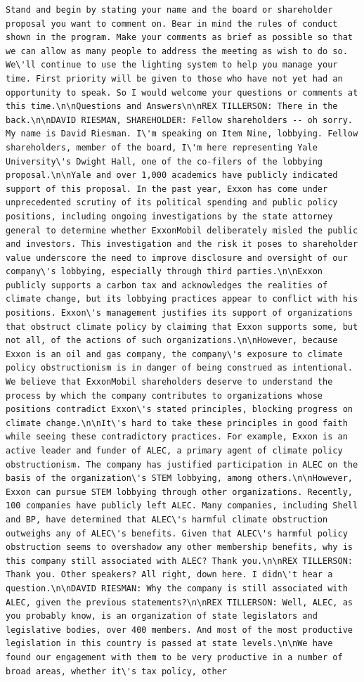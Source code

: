 \documentclass[
  letterpaper,
  DIV=11,
  numbers=noendperiod]{scrreprt}
\begin{document}
\begin{verbatim}
Stand and begin by stating your name and the board or shareholder proposal you want to comment on. Bear in mind the rules of conduct shown in the program. Make your comments as brief as possible so that we can allow as many people to address the meeting as wish to do so. We\'ll continue to use the lighting system to help you manage your time. First priority will be given to those who have not yet had an opportunity to speak. So I would welcome your questions or comments at this time.\n\nQuestions and Answers\n\nREX TILLERSON: There in the back.\n\nDAVID RIESMAN, SHAREHOLDER: Fellow shareholders -- oh sorry. My name is David Riesman. I\'m speaking on Item Nine, lobbying. Fellow shareholders, member of the board, I\'m here representing Yale University\'s Dwight Hall, one of the co-filers of the lobbying proposal.\n\nYale and over 1,000 academics have publicly indicated support of this proposal. In the past year, Exxon has come under unprecedented scrutiny of its political spending and public policy positions, including ongoing investigations by the state attorney general to determine whether ExxonMobil deliberately misled the public and investors. This investigation and the risk it poses to shareholder value underscore the need to improve disclosure and oversight of our company\'s lobbying, especially through third parties.\n\nExxon publicly supports a carbon tax and acknowledges the realities of climate change, but its lobbying practices appear to conflict with his positions. Exxon\'s management justifies its support of organizations that obstruct climate policy by claiming that Exxon supports some, but not all, of the actions of such organizations.\n\nHowever, because Exxon is an oil and gas company, the company\'s exposure to climate policy obstructionism is in danger of being construed as intentional. We believe that ExxonMobil shareholders deserve to understand the process by which the company contributes to organizations whose positions contradict Exxon\'s stated principles, blocking progress on climate change.\n\nIt\'s hard to take these principles in good faith while seeing these contradictory practices. For example, Exxon is an active leader and funder of ALEC, a primary agent of climate policy obstructionism. The company has justified participation in ALEC on the basis of the organization\'s STEM lobbying, among others.\n\nHowever, Exxon can pursue STEM lobbying through other organizations. Recently, 100 companies have publicly left ALEC. Many companies, including Shell and BP, have determined that ALEC\'s harmful climate obstruction outweighs any of ALEC\'s benefits. Given that ALEC\'s harmful policy obstruction seems to overshadow any other membership benefits, why is this company still associated with ALEC? Thank you.\n\nREX TILLERSON: Thank you. Other speakers? All right, down here. I didn\'t hear a question.\n\nDAVID RIESMAN: Why the company is still associated with ALEC, given the previous statements?\n\nREX TILLERSON: Well, ALEC, as you probably know, is an organization of state legislators and legislative bodies, over 400 members. And most of the most productive legislation in this country is passed at state levels.\n\nWe have found our engagement with them to be very productive in a number of broad areas, whether it\'s tax policy, other 
\end{verbatim}
\end{document}
